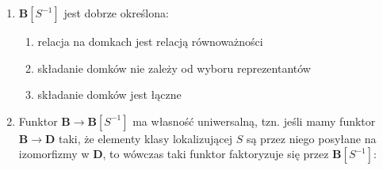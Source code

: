 \begin{theorem}$ $

  \begin{enumerate}
    \item $\mathbf{B}[S^{-1}]$ jest dobrze określona:
      \begin{enumerate}
        \item relacja na domkach jest relacją równoważności 
        \item składanie domków nie zależy od wyboru reprezentantów
        \item składanie domków jest łączne
      \end{enumerate}
    \item Funktor $\mathbf{B}\to \mathbf{B}[S^{-1}]$ ma własność uniwersalną, tzn. jeśli mamy funktor $\mathbf{B}\to \mathbf{D}$ taki, że elementy klasy lokalizującej $S$ są przez niego posyłane na izomorfizmy w $\mathbf{D}$, to wówczas taki funktor faktoryzuje się przez $\mathbf{B}[S^{-1}]$:
      \begin{center}\end{center}
  \end{enumerate}
\end{theorem}


